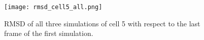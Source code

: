 \begin{figure}[ht]
\centering
  \texttt{[image: rmsd\_cell5\_all.png]}
  \caption{RMSD of all three simulations of cell 5 with respect to the last frame of the first simulation.}
  \label{fig:rmsd_cell5_all}
\end{figure}




